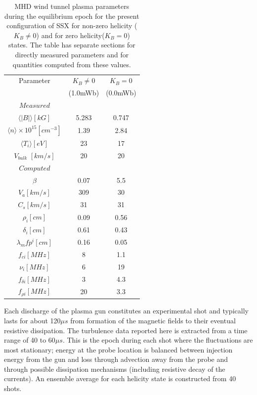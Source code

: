 \documentclass[aip,prl,amsmath,amssymb,reprint,superscriptaddress]{revtex4-1} %
\begin{document}




\begin{table}
\caption{\label{tab:params}MHD wind tunnel plasma parameters during the equilibrium epoch for the present configuration of SSX for non-zero helicity ($K_{B}\neq 0$) and for zero helicity($K_{B}=0$) states. The table has separate sections for directly measured parameters and for quantities computed from these values.}
\begin{tabular}{c|cc}
\toprule
Parameter&$K_{B}\neq 0$&$K_{B}=0$\\
				 &(1.0mWb)             &(0.0mWb)\\
\hline
$Measured$&&\\
\hline
$\langle |B|\rangle [kG]$&5.283&0.747\\
$\langle n\rangle \times 10^{15} [cm^{-3}]$&1.39&2.84\\
$\langle T_{i}\rangle [eV]$&23&17\\
$V_{bulk}$ $[km/s]$&20&20\\
\hline
$Computed$&&\\
\hline
$\beta$&0.07&5.5\\
$V_{a} [km/s]$&309&30\\
$C_{s} [km/s]$&31&31\\
$\rho_{i} [cm]$&0.09&0.56\\
$\delta_{i} [cm]$&0.61&0.43\\
$\lambda_mfp^{i} [cm]$&0.16&0.05\\
$f_{ci} [MHz]$&8&1.1\\
$\nu_{i} [MHz]$&6&19\\
$f_{\delta i} [MHz]$&3&4.3\\
$f_{\rho i} [MHz]$&20&3.3\\
\hline
\end{tabular}
\end{table}

Each discharge of the plasma gun constitutes an experimental shot and typically lasts for about 120$\mu s$ from formation of the magnetic fields to their eventual resistive dissipation. The turbulence data reported here is extracted from a time range of 40 to 60$\mu s$. This is the epoch during each shot where the fluctuations are most stationary; energy at the probe location is balanced between injection energy from the gun and loss through advection away from the probe and through possible dissipation mechanisms (including resistive decay of the currents). An ensemble average for each helicity state is constructed from 40 shots.
\end{document}

